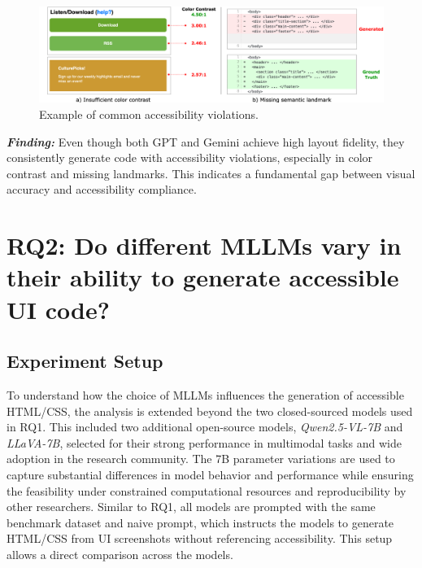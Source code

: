 \begin{figure}[htbp]
  \centering
  \includegraphics[width=0.9\linewidth]{figures/colorcontrastlandmarkexample.png}
  \caption{Example of common accessibility violations.}
  \label{fig:common} 
\end{figure}


\begin{center}
\begin{tcolorbox}[colback=black!5!white,colframe=black!75!black,bottom=-0.05pt,top=-0.05pt]
\textit{\textbf{Finding:}} Even though both GPT and Gemini achieve high layout fidelity, 
they consistently generate code with accessibility violations, 
especially in color contrast and missing landmarks. This indicates 
a fundamental gap between visual accuracy and accessibility compliance.
\end{tcolorbox}
\end{center}


\begingroup
    
\endgroup



\section{RQ2: Do different MLLMs vary in their ability to generate accessible UI code?}
\subsection{Experiment Setup}
To understand how the choice of MLLMs influences the generation of 
accessible HTML/CSS, the analysis is extended beyond the two 
closed-sourced models used in RQ1. This included two additional 
open-source models, \textit{Qwen2.5-VL-7B} and \textit{LLaVA-7B}, 
selected for their strong performance in multimodal tasks and 
wide adoption in the research community. 
The 7B parameter variations are used to capture substantial 
differences in model behavior and performance while ensuring 
the feasibility under constrained computational resources and 
reproducibility by other researchers.
Similar to RQ1, all models are prompted with the same 
benchmark dataset and naive prompt,
which instructs the models to generate HTML/CSS from UI screenshots
without referencing accessibility. This setup allows a 
direct comparison across the models.

